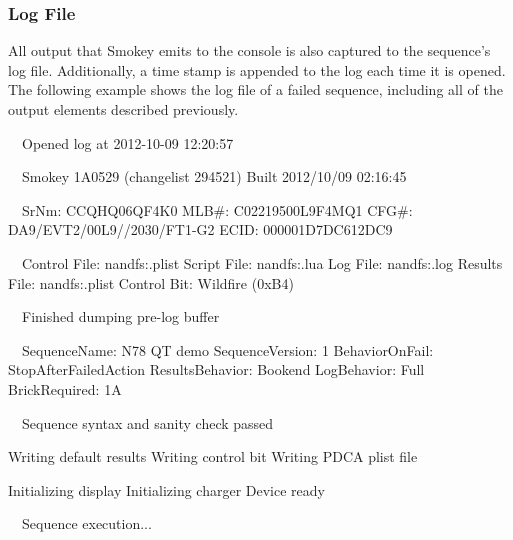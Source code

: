 \subsubsection{Log File}

All output that Smokey emits to the console is also captured to the sequence's
log file.  Additionally, a time stamp is appended to the log each time it is
opened.  The following example shows the log file of a failed sequence,
including all of the output elements described previously.

\begin{AnnotedLogFile}
~~Opened log at 2012-10-09 12:20:57

~~Smokey 1A0529 (changelist 294521)
Built 2012/10/09 02:16:45

~~SrNm: CCQHQ06QF4K0
MLB#: C02219500L9F4MQ1
CFG#: DA9/EVT2/00L9//2030/FT1-G2
ECID: 000001D7DC612DC9

~~Control File: nandfs:\AppleInternal\Diags\Logs\Smokey\Wildfire{}\Main.plist
Script File:  nandfs:\AppleInternal\Diags\Logs\Smokey\Wildfire{}\Main.lua
Log File:     nandfs:\AppleInternal\Diags\Logs\Smokey\Wildfire\Smokey.log
Results File: nandfs:\AppleInternal\Diags\Logs\Smokey\Wildfire\PDCA.plist
Control Bit:  Wildfire (0xB4)

~~Finished dumping pre-log buffer

~~SequenceName:    N78 QT demo
SequenceVersion: 1
BehaviorOnFail:  StopAfterFailedAction
ResultsBehavior: Bookend
LogBehavior:     Full
BrickRequired:   1A

~~Sequence syntax and sanity check passed

Writing default results
Writing control bit
Writing PDCA plist file

Initializing display
Initializing charger
Device ready

~~Sequence execution...


\end{AnnotedLogFile}
